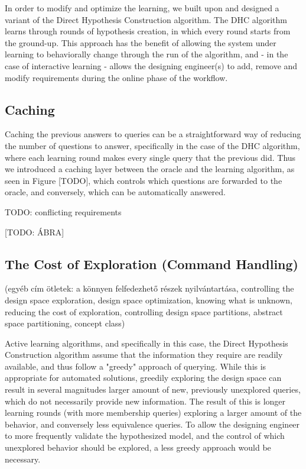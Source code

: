 In order to modify and optimize the learning, we built upon and designed a variant of the Direct Hypothesis Construction algorithm. The DHC algorithm learns through rounds of hypothesis creation, in which every round starts from the ground-up. This approach has the benefit of allowing the system under learning to behaviorally change through the run of the algorithm, and - in the case of interactive learning - allows the designing engineer(s) to add, remove and modify requirements during the online phase of the workflow.

\subsection{Caching} \label{subs_cachingintheframework}
Caching the previous answers to queries can be a straightforward way of reducing the number of questions to answer, specifically in the case of the DHC algorithm, where each learning round makes every single query that the previous did. Thus we introduced a caching layer between the oracle and the learning algorithm, as seen in Figure [TODO], which controls which questions are forwarded to the oracle, and conversely, which can be automatically answered.

TODO: conflicting requirements

[TODO: ÁBRA]
\subsection{The Cost of Exploration (Command Handling)} \label{subs_commandhandling}
(egyéb cím ötletek: a könnyen felfedezhető részek nyilvántartása, controlling the design space exploration, design space optimization, knowing what is unknown, reducing the cost of exploration, controlling design space partitions, abstract space partitioning, concept class)

Active learning algorithms, and specifically in this case, the Direct Hypothesis Construction algorithm assume that the information they require are readily available, and thus follow a "greedy" approach of querying. While this is appropriate for automated solutions, greedily exploring the design space can result in several magnitudes larger amount of new, previously unexplored queries, which do not necessarily provide new information. The result of this is longer learning rounds (with more membership queries) exploring a larger amount of the behavior, and conversely less equivalence queries. To allow the designing engineer to more frequently validate the hypothesized model, and the control of which unexplored behavior should be explored, a less greedy approach would be necessary.

